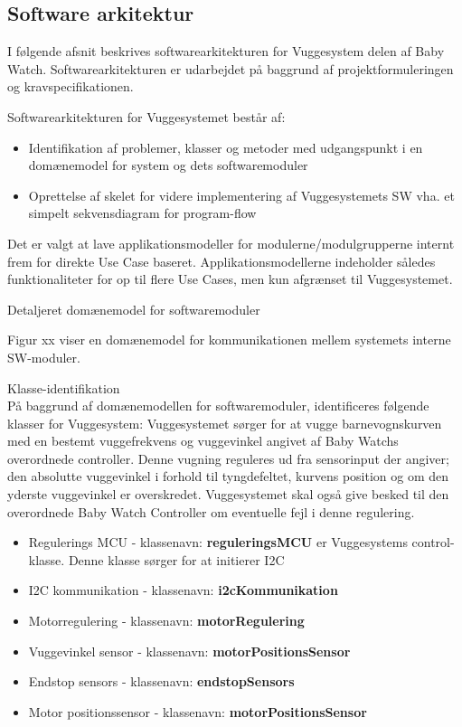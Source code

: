 \newpage
\subsection{Software arkitektur}

I følgende afsnit beskrives softwarearkitekturen for Vuggesystem delen af Baby Watch. Softwarearkitekturen er udarbejdet på baggrund af projektformuleringen og kravspecifikationen. 

\vspace{5mm}

Softwarearkitekturen for Vuggesystemet består af: 
\begin{itemize}
\item Identifikation af problemer, klasser og metoder med udgangspunkt i en domænemodel for system og dets softwaremoduler  
\item Oprettelse af skelet for videre implementering af Vuggesystemets SW vha. et simpelt sekvensdiagram for program-flow 
\end{itemize}

Det er valgt at lave applikationsmodeller for modulerne/modulgrupperne internt frem for direkte Use Case baseret. Applikationsmodellerne indeholder således funktionaliteter for op til flere Use Cases, men kun afgrænset til Vuggesystemet. 

\vspace{5mm}
Detaljeret domænemodel for softwaremoduler 


\vspace{80mm}
Figur xx viser en domænemodel for kommunikationen mellem systemets interne SW-moduler.

Klasse-identifikation \\
På baggrund af domænemodellen for softwaremoduler, identificeres følgende klasser for Vuggesystem:
Vuggesystemet sørger for at vugge barnevognskurven med en bestemt vuggefrekvens og vuggevinkel angivet af Baby Watchs overordnede controller. Denne vugning reguleres ud fra sensorinput der angiver; den absolutte vuggevinkel i forhold til tyngdefeltet, kurvens position og om den yderste vuggevinkel er overskredet. Vuggesystemet skal også give besked til den overordnede Baby Watch Controller om eventuelle fejl i denne regulering.

\begin{itemize}
\item Regulerings MCU - klassenavn: \textbf{reguleringsMCU} er Vuggesystems control-klasse. Denne klasse sørger for at initierer I2C
\item I2C kommunikation - klassenavn: \textbf{i2cKommunikation}
\item Motorregulering - klassenavn: \textbf{motorRegulering}
\item Vuggevinkel sensor - klassenavn: \textbf{motorPositionsSensor}
\item Endstop sensors - klassenavn: \textbf{endstopSensors}
\item Motor positionssensor - klassenavn: \textbf{motorPositionsSensor}
\end{itemize}